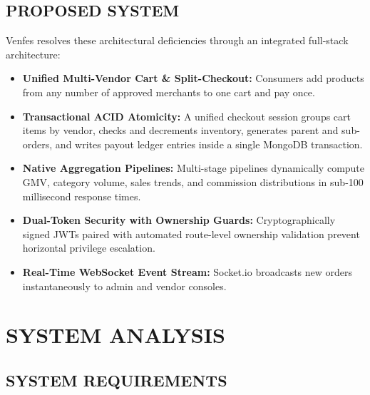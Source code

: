 \documentclass[12pt,a4paper]{report}
\begin{document}
\section{PROPOSED SYSTEM}
Venfes resolves these architectural deficiencies through an integrated full-stack architecture:
\begin{itemize}[leftmargin=1.5cm]
    \item \textbf{Unified Multi-Vendor Cart \& Split-Checkout:} Consumers add products from any number of approved merchants to one cart and pay once.
    \item \textbf{Transactional ACID Atomicity:} A unified checkout session groups cart items by vendor, checks and decrements inventory, generates parent and sub-orders, and writes payout ledger entries inside a single MongoDB transaction.
    \item \textbf{Native Aggregation Pipelines:} Multi-stage pipelines dynamically compute GMV, category volume, sales trends, and commission distributions in sub-100 millisecond response times.
    \item \textbf{Dual-Token Security with Ownership Guards:} Cryptographically signed JWTs paired with automated route-level ownership validation prevent horizontal privilege escalation.
    \item \textbf{Real-Time WebSocket Event Stream:} Socket.io broadcasts new orders instantaneously to admin and vendor consoles.
\end{itemize}

\chapter{SYSTEM ANALYSIS}

\section{SYSTEM REQUIREMENTS}
\end{document}
